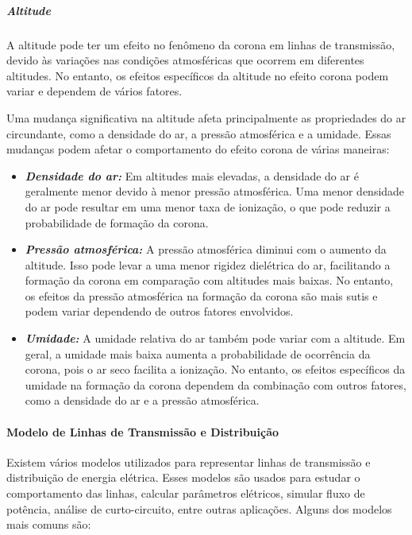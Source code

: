 \documentclass[a4paper, 12pt, onecolumn,singlespacing]{article}
\begin{document}
		\subparagraph{Altitude} A altitude pode ter um efeito no fenômeno da corona em linhas de transmissão, devido às variações nas condições atmosféricas que ocorrem em diferentes altitudes. No entanto, os efeitos específicos da altitude no efeito corona podem variar e dependem de vários fatores.
		
		Uma mudança significativa na altitude afeta principalmente as propriedades do ar circundante, como a densidade do ar, a pressão atmosférica e a umidade. Essas mudanças podem afetar o comportamento do efeito corona de várias maneiras:
		
		\begin{itemize}
			\item \textbf{\textit{Densidade do ar:}} Em altitudes mais elevadas, a densidade do ar é geralmente menor devido à menor pressão atmosférica. Uma menor densidade do ar pode resultar em uma menor taxa de ionização, o que pode reduzir a probabilidade de formação da corona.
			
			\item \textbf{\textit{Pressão atmosférica:}} A pressão atmosférica diminui com o aumento da altitude. Isso pode levar a uma menor rigidez dielétrica do ar, facilitando a formação da corona em comparação com altitudes mais baixas. No entanto, os efeitos da pressão atmosférica na formação da corona são mais sutis e podem variar dependendo de outros fatores envolvidos.
			
			\item \textbf{\textit{Umidade:}} A umidade relativa do ar também pode variar com a altitude. Em geral, a umidade mais baixa aumenta a probabilidade de ocorrência da corona, pois o ar seco facilita a ionização. No entanto, os efeitos específicos da umidade na formação da corona dependem da combinação com outros fatores, como a densidade do ar e a pressão atmosférica.
			
		\end{itemize}

		\paragraph{Modelo de Linhas de Transmissão e Distribuição} Existem vários modelos utilizados para representar linhas de transmissão e distribuição de energia elétrica. Esses modelos são usados para estudar o comportamento das linhas, calcular parâmetros elétricos, simular fluxo de potência, análise de curto-circuito, entre outras aplicações. Alguns dos modelos mais comuns são:
		
\end{document}
